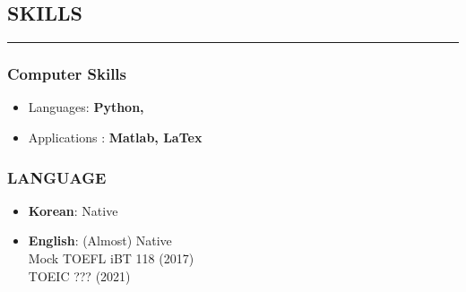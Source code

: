 \documentclass[10pt,a4]{article}
\begin{document}
\begin{small}
\lhead{\textcolor{gray}{\it Junghyun Lee}}
\fancyfoot[C]{}

\subsection*{SKILLS}
\hrule
\vspace{0.2cm}

\subsubsection*{Computer Skills}

\begin{itemize}
	\item Languages: \textbf{Python,
	}
	\item Applications : \textbf{Matlab,
	 LaTex}
\end{itemize}

\subsubsection*{LANGUAGE}

\begin{itemize}{}{}
	\item \textbf{Korean}: Native
	\item \textbf{English}: (Almost) Native \\
	Mock TOEFL iBT 118 (2017) \\
	TOEIC ??? (2021)
	
\end{itemize}

\vspace{0.1cm}


\end{small}
\end{document}

